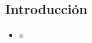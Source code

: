 \documentclass[a0,portrait]{a0poster}
\begin{document}
\begin{multicols}{2} %




  \color{Black} %
  \section*{Introducción}
  \begin{itemize}
  \item s
  \end{itemize}



  \color{Black} %

\end{multicols}
\end{document}
